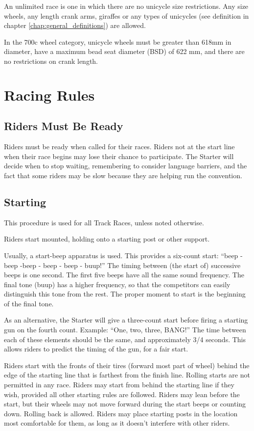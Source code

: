 An unlimited race is one in which there are no unicycle size restrictions.
Any size wheels, any length crank arms, giraffes or any types of unicycles (see definition in chapter \ref{chap:general_definitions}) are allowed.

In the 700c wheel category, unicycle wheels must be greater than 618mm in diameter, have a maximum bead seat diameter (BSD) of 622 mm, and there are no restrictions on crank length.

\section{Racing Rules}

\subsection{Riders Must Be Ready}

Riders must be ready when called for their races.
Riders not at the start line when their race begins may lose their chance to participate.
The Starter will decide when to stop waiting, remembering to consider language barriers, and the fact that some riders may be slow because they are helping run the convention.

\subsection{Starting \label{subsec:track_starting}}

This procedure is used for all Track Races, unless noted otherwise.

Riders start mounted, holding onto a starting post or other support.

Usually, a start-beep apparatus is used.
This provides a six-count start: ``beep - beep -beep - beep - beep - buup!''
The timing between (the start of) successive beeps is one second.
The first five beeps have all the same sound frequency.
The final tone (buup) has a higher frequency, so that the competitors can easily distinguish this tone from the rest. The proper moment to start is the beginning of the final tone.

As an alternative, the Starter will give a three-count start before firing a starting gun on the fourth count.
Example: ``One, two, three, BANG!''
The time between each of these elements should be the same, and approximately 3/4 seconds.
This allows riders to predict the timing of the gun, for a fair start.

Riders start with the fronts of their tires (forward most part of wheel) behind the edge of the starting line that is farthest from the finish line.
Rolling starts are not permitted in any race.
Riders may start from behind the starting line if they wish, provided all other starting rules are followed.
Riders may lean before the start, but their wheels may not move forward during the start beeps or counting down.
Rolling back is allowed.
Riders may place starting posts in the location most comfortable for them, as long as it doesn't interfere with other riders.

